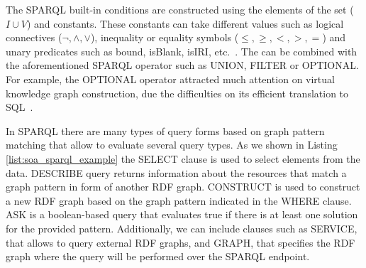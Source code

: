 \begin{table}[!ht]
\centering
\caption{Example of a SPARQL result-set}
\label{tab:soa_result_set}
\end{table}

The SPARQL built-in conditions are constructed using the elements of the set ($I \cup V$) and constants. These constants can take different values such as logical connectives ($\neg,\wedge,\vee $), inequality or equality symbols ($\leq,\geq,<,>,= $) and unary predicates such as bound, isBlank, isIRI, etc.~\citep{SPARQL}. The can be combined with the aforementioned SPARQL operator such as UNION, FILTER or OPTIONAL. For example, the OPTIONAL operator attracted much attention on virtual knowledge graph construction, due the difficulties on its efficient translation to SQL~\citep{xiao2018efficient}.

In SPARQL there are many types of query forms based on graph pattern matching that allow to evaluate several query types. As we shown in Listing \ref{list:soa_sparql_example} the SELECT clause is used to select elements from the data. DESCRIBE query returns information about the resources that match a graph pattern in form of another RDF graph. CONSTRUCT is used to construct a new RDF graph based on the graph pattern indicated in the WHERE clause. ASK is a boolean-based query that evaluates true if there is at least one solution for the provided pattern. Additionally, we can include clauses such as SERVICE, that allows to query external RDF graphs, and GRAPH, that specifies the RDF graph where the query will be performed over the SPARQL endpoint.

